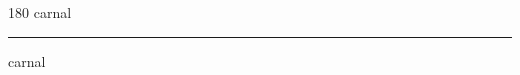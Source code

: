 
\begin{frame}
\begin{center}
\begin{turn}{180}
{\fontsize{2.5cm}{1em}\selectfont carnal}
\end{turn}
\vspace{1em}\par  
\hrule
\vspace{1em}\par  
{\fontsize{2.5cm}{1em}\selectfont carnal}
\end{center}
\end{frame}
